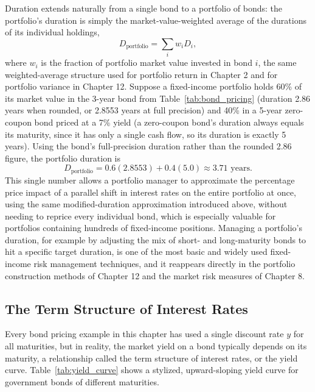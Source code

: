 \documentclass[../ai_in_finance]{subfiles}
\begin{document}
Duration extends naturally from a single bond to a portfolio of bonds: the portfolio's duration is simply the market-value-weighted average of the durations of its individual holdings,
\begin{equation*}
D_{\text{portfolio}} = \sum_i w_i D_i,
\end{equation*}
where $w_i$ is the fraction of portfolio market value invested in bond $i$, the same weighted-average structure used for portfolio return in Chapter 2 and for portfolio variance in Chapter 12. Suppose a fixed-income portfolio holds 60\% of its market value in the 3-year bond from Table~\ref{tab:bond_pricing} (duration 2.86 years when rounded, or 2.8553 years at full precision) and 40\% in a 5-year zero-coupon bond priced at a 7\% yield (a zero-coupon bond's duration always equals its maturity, since it has only a single cash flow, so its duration is exactly 5 years). Using the bond's full-precision duration rather than the rounded 2.86 figure, the portfolio duration is
\begin{equation*}
D_{\text{portfolio}} = 0.6(2.8553) + 0.4(5.0) \approx 3.71 \text{ years}.
\end{equation*}
This single number allows a portfolio manager to approximate the percentage price impact of a parallel shift in interest rates on the entire portfolio at once, using the same modified-duration approximation introduced above, without needing to reprice every individual bond, which is especially valuable for portfolios containing hundreds of fixed-income positions. Managing a portfolio's duration, for example by adjusting the mix of short- and long-maturity bonds to hit a specific target duration, is one of the most basic and widely used fixed-income risk management techniques, and it reappears directly in the portfolio construction methods of Chapter 12 and the market risk measures of Chapter 8.

\subsection{The Term Structure of Interest Rates}

Every bond pricing example in this chapter has used a single discount rate $y$ for all maturities, but in reality, the market yield on a bond typically depends on its maturity, a relationship called the term structure of interest rates, or the yield curve. Table~\ref{tab:yield_curve} shows a stylized, upward-sloping yield curve for government bonds of different maturities.
\end{document}
